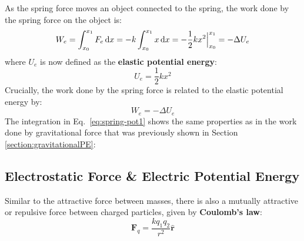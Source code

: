 As the spring force moves an object connected to the spring, the work done by
the spring force on the object is:
\begin{equation}
  W_e=\int_{x_0}^{x_1}F_e\dl x =-k\int_{x_0}^{x_1} x\dl x
  =-\frac12kx^2\Big|^{x_1}_{x_0}=-\Delta U_e
  \label{eq:spring-pot1}
\end{equation}
where $U_e$ is now defined as the \textbf{elastic potential energy}:
\begin{equation}
  \boxed{
    U_e=\frac12kx^2
  }
\end{equation}
Crucially, the work done by the spring force is related to the elastic
potential energy by:
\begin{equation}
  \boxed{
    W_e=-\Delta U_e
  }
\end{equation}
The integration in Eq.~\ref{eq:spring-pot1} shows the same properties as in
the work done by gravitational force that was previously shown in
Section \ref{section:gravitationalPE}:


\subsection{Electrostatic Force \& Electric Potential Energy}
Similar to the attractive force between masses, there is also a mutually
attractive or repulsive force between charged particles, given by
\textbf{Coulomb's law}:
\begin{equation}
  \boxed{
    \bm F_q=\frac{kq_1q_2}{r^2}\hat{\bm r}
  }
\end{equation}

